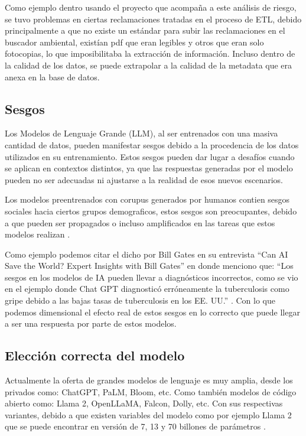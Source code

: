 Como ejemplo dentro usando el proyecto que acompaña a este análisis de riesgo, se tuvo problemas en ciertas reclamaciones tratadas en el proceso 
de ETL, debido principalmente a que no existe un estándar para subir las reclamaciones en el buscador ambiental, existían pdf que eran legibles y otros 
que eran solo fotocopias, lo que imposibilitaba la extracción de información. Incluso dentro de la calidad de los datos, se puede extrapolar a la 
calidad de la metadata que era anexa en la base de datos.

\subsection{Sesgos} %

Los Modelos de Lenguaje Grande (LLM), al ser entrenados con una masiva cantidad de datos, pueden manifestar sesgos debido a 
la procedencia de los datos utilizados en su entrenamiento. Estos sesgos pueden dar lugar a desafíos cuando se aplican en 
contextos distintos, ya que las respuestas generadas por el modelo pueden no ser adecuadas ni ajustarse a la realidad de 
esos nuevos escenarios.

Los modelos preentrenados con corupus generados por humanos contien sesgos sociales hacia ciertos grupos demograficos, estos
sesgos son preocupantes, debido a que pueden ser propagados o incluso amplificados en las tareas que estos modelos realizan \cite{sesgo2}.

Como ejemplo podemos citar el dicho por Bill Gates en su entrevista ``Can AI Save the World? Expert Insights with Bill Gates''  en donde menciono que: 
``Los sesgos en los modelos de IA pueden llevar a diagnósticos incorrectos, como se vio en el ejemplo donde Chat GPT diagnosticó erróneamente la 
tuberculosis como gripe debido a las bajas tasas de tuberculosis en los EE. UU.'' \cite{billgates1}. Con lo que podemos dimensional el efecto real de estos sesgos 
en lo correcto que puede llegar a ser una respuesta por parte de estos modelos.

\subsection{Elección correcta del modelo}
Actualmente la oferta de grandes modelos de lenguaje es muy amplia, desde los privados como: ChatGPT, PaLM, Bloom, etc. 
Como también modelos de código abierto como: Llama 2, OpenLLaMA, Falcon, Dolly, etc. \cite{modelos2} Con sus respectivas variantes, debido a que existen 
variables del modelo como por ejemplo Llama 2 que se puede encontrar en versión de 7, 13 y 70 billones de parámetros \cite{modelos3}. 

